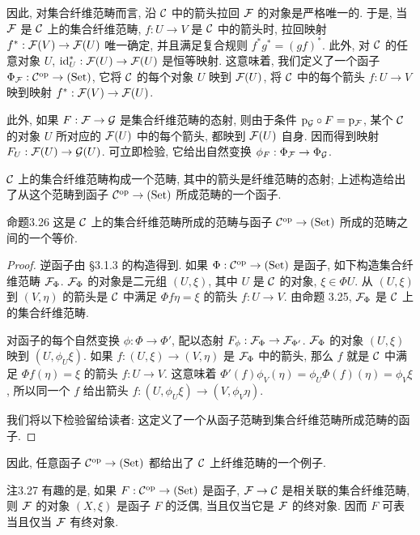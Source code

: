 因此, 对集合纤维范畴而言, 沿 $\mathcal C$ 中的箭头拉回 $\mathcal F$ 的对象是严格唯一的. 于是, 当 $\mathcal F$ 是 $\mathcal C$ 上的集合纤维范畴, $f:U\to V$ 是 $\mathcal C$ 中的箭头时, 拉回映射 $f^*:\mathcal F(V)\to\mathcal F(U)$ 唯一确定, 并且满足复合规则 $f^*g^*=(gf)^*$. 此外, 对 $\mathcal C$ 的任意对象 $U$, $\mathrm{id}_U^*:\mathcal F(U)\to\mathcal F(U)$ 是恒等映射. 这意味着, 我们定义了一个函子 $\Phi_{\mathcal F}:\mathcal C^{\mathrm{op}}\to(\mathrm{Set})$, 它将 $\mathcal C$ 的每个对象 $U$ 映到 $\mathcal F(U)$, 将 $\mathcal C$ 中的每个箭头 $f:U\to V$ 映到映射 $f^*:\mathcal F(V)\to\mathcal F(U)$.

此外, 如果 $F:\mathcal F\to\mathcal G$ 是集合纤维范畴的态射, 则由于条件 $\mathrm p_{\mathcal G}\circ F=\mathrm p_{\mathcal F}$, 某个 $\mathcal C$ 的对象 $U$ 所对应的 $\mathcal F(U)$ 中的每个箭头,
都映到 $\mathcal F(U)$ 自身. 因而得到映射 $F_U:\mathcal F(U)\to\mathcal G(U)$. 可立即检验, 它给出自然变换 $\phi_F:\Phi_{\mathcal F}\to\Phi_{\mathcal G}$.

$\mathcal C$ 上的集合纤维范畴构成一个范畴, 其中的箭头是纤维范畴的态射; 上述构造给出了从这个范畴到函子 $\mathcal C^{\mathrm{op}}\to(\mathrm{Set})$ 所成范畴的一个函子.

\begin{origstatement}{命题}{3.26}\label{ch03:prop326}
这是 $\mathcal C$ 上的集合纤维范畴所成的范畴与函子 $\mathcal C^{\mathrm{op}}\to(\mathrm{Set})$ 所成的范畴之间的一个等价.
\end{origstatement}
\begin{proof}
逆函子由 \S3.1.3 的构造得到. 如果 $\Phi:\mathcal C^{\mathrm{op}}\to(\mathrm{Set})$ 是函子, 如下构造集合纤维范畴 $\mathcal F_\Phi$. $\mathcal F_\Phi$ 的对象是二元组 $(U,\xi)$, 其中 $U$ 是 $\mathcal C$ 的对象, $\xi\in\Phi U$. 从 $(U,\xi)$ 到 $(V,\eta)$ 的箭头是 $\mathcal C$ 中满足 $\Phi f\eta=\xi$ 的箭头 $f:U\to V$. 由命题 3.25, $\mathcal F_\Phi$ 是 $\mathcal C$ 上的集合纤维范畴.

对函子的每个自然变换 $\phi:\Phi\to\Phi'$, 配以态射 $F_\phi:\mathcal F_\Phi\to\mathcal F_{\Phi'}$. $\mathcal F_\Phi$ 的对象 $(U,\xi)$ 映到 $(U,\phi_U\xi)$. 如果 $f:(U,\xi)\to(V,\eta)$ 是 $\mathcal F_\Phi$ 中的箭头, 那么 $f$ 就是 $\mathcal C$ 中满足 $\Phi f(\eta)=\xi$ 的箭头 $f:U\to V$. 这意味着 $\Phi'(f)\phi_V(\eta)=\phi_U\Phi(f)(\eta)=\phi_V\xi$, 所以同一个 $f$ 给出箭头 $f:(U,\phi_U\xi)\to(V,\phi_V\eta)$.

我们将以下检验留给读者: 这定义了一个从函子范畴到集合纤维范畴所成范畴的函子.
\end{proof}

因此, 任意函子 $\mathcal C^{\mathrm{op}}\to(\mathrm{Set})$ 都给出了 $\mathcal C$ 上纤维范畴的一个例子.

\begin{origstatement}{注}{3.27}\label{ch03:rem327}
有趣的是, 如果 $F:\mathcal C^{\mathrm{op}}\to(\mathrm{Set})$ 是函子, $\mathcal F\to\mathcal C$ 是相关联的集合纤维范畴, 则 $\mathcal F$ 的对象 $(X,\xi)$ 是函子 $F$ 的泛偶, 当且仅当它是 $\mathcal F$ 的终对象. 因而 $F$ 可表当且仅当 $\mathcal F$ 有终对象.
\end{origstatement}

